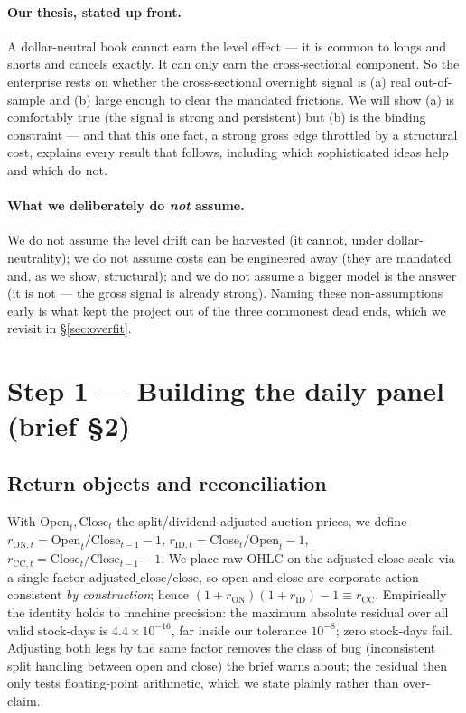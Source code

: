 \documentclass[11pt,a4paper]{article}
\newcommand{\reconResid}{4.4\times10^{-16}}
\begin{document}
\paragraph{Our thesis, stated up front.} A dollar-neutral book cannot earn the level effect --- it is common to
longs and shorts and cancels exactly. It can only earn the cross-sectional component. So the enterprise rests on
whether the cross-sectional overnight signal is (a) real out-of-sample and (b) large enough to clear the mandated
frictions. We will show (a) is comfortably true (the signal is strong and persistent) but (b) is the binding
constraint --- and that this one fact, a strong gross edge throttled by a structural cost, explains every result
that follows, including which sophisticated ideas help and which do not.

\paragraph{What we deliberately do \emph{not} assume.} We do not assume the level drift can be harvested (it
cannot, under dollar-neutrality); we do not assume costs can be engineered away (they are mandated and, as we
show, structural); and we do not assume a bigger model is the answer (it is not --- the gross signal is already
strong). Naming these non-assumptions early is what kept the project out of the three commonest dead ends, which
we revisit in \S\ref{sec:overfit}.

\section{Step 1 --- Building the daily panel (brief §2)}

\subsection{Return objects and reconciliation}
With $\mathrm{Open}_t,\mathrm{Close}_t$ the split/dividend-adjusted auction prices, we define
$r_{\mathrm{ON},t}=\mathrm{Open}_t/\mathrm{Close}_{t-1}-1$,
$r_{\mathrm{ID},t}=\mathrm{Close}_t/\mathrm{Open}_t-1$,
$r_{\mathrm{CC},t}=\mathrm{Close}_t/\mathrm{Close}_{t-1}-1$. We place raw OHLC on the adjusted-close scale via
a single factor $\mathrm{adjusted\_close}/\mathrm{close}$, so open and close are corporate-action-consistent
\emph{by construction}; hence $(1+r_{\mathrm{ON}})(1+r_{\mathrm{ID}})-1\equiv r_{\mathrm{CC}}$. Empirically the
identity holds to machine precision: the maximum absolute residual over all valid stock-days is
$\reconResid$, far inside our tolerance $10^{-8}$; zero stock-days fail. Adjusting both legs by the same factor
removes the class of bug (inconsistent split handling between open and close) the brief warns about; the
residual then only tests floating-point arithmetic, which we state plainly rather than over-claim.
\end{document}
